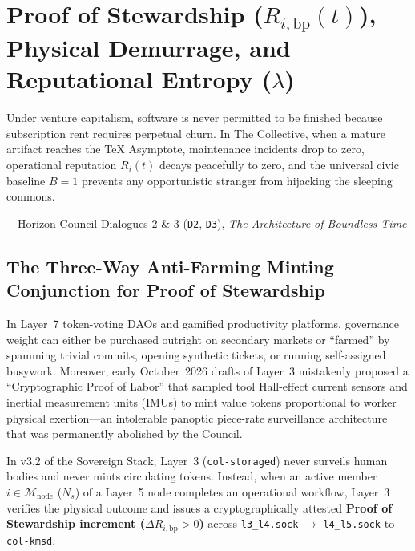\chapter{Proof of Stewardship ($R_{i,\mathrm{bp}}(t)$), Physical Demurrage, and Reputational Entropy ($\lambda$)}
\label{ch:proof-of-stewardship-entropy}

\epigraph{Under venture capitalism, software is never permitted to be finished because subscription rent requires perpetual churn. In The Collective, when a mature artifact reaches the TeX Asymptote, maintenance incidents drop to zero, operational reputation $R_i(t)$ decays peacefully to zero, and the universal civic baseline $B = 1$ prevents any opportunistic stranger from hijacking the sleeping commons.}{---Horizon Council Dialogues 2 \& 3 (\texttt{D2}, \texttt{D3}), \textit{The Architecture of Boundless Time}}

\section{The Three-Way Anti-Farming Minting Conjunction for Proof of Stewardship}
\label{sec:ch5-anti-farming}

In Layer~7 token-voting DAOs and gamified productivity platforms, governance weight can either be purchased outright on secondary markets or ``farmed'' by spamming trivial commits, opening synthetic tickets, or running self-assigned busywork. Moreover, early October~2026 drafts of Layer~3 mistakenly proposed a ``Cryptographic Proof of Labor'' that sampled tool Hall-effect current sensors and inertial measurement units (IMUs) to mint value tokens proportional to worker physical exertion---an intolerable panoptic piece-rate surveillance architecture that was permanently abolished by the Council.

In v3.2 of the Sovereign Stack, Layer~3 (\texttt{col-storaged}) never surveils human bodies and never mints circulating tokens. Instead, when an active member $i \in \mathcal{M}_{\mathrm{node}}$ ($N_s$) of a Layer~5 node completes an operational workflow, Layer~3 verifies the physical outcome and issues a cryptographically attested \textbf{Proof of Stewardship increment ($\Delta R_{i,\mathrm{bp}} > 0$)} across \texttt{l3\_l4.sock} $\to$ \texttt{l4\_l5.sock} to \texttt{col-kmsd}.

